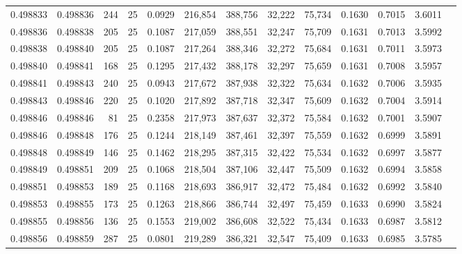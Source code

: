 \begin{tabular}{rrrrrrrrrrrrr}
0.498833 & 0.498836 & 244 &  25 &                                     0.0929 & 216,854 & 388,756 &  32,222 &  75,734 & 0.1630 & 0.7015 & 3.6011 \\
0.498836 & 0.498838 & 205 &  25 &                                     0.1087 & 217,059 & 388,551 &  32,247 &  75,709 & 0.1631 & 0.7013 & 3.5992 \\
0.498838 & 0.498840 & 205 &  25 &                                     0.1087 & 217,264 & 388,346 &  32,272 &  75,684 & 0.1631 & 0.7011 & 3.5973 \\
0.498840 & 0.498841 & 168 &  25 &                                     0.1295 & 217,432 & 388,178 &  32,297 &  75,659 & 0.1631 & 0.7008 & 3.5957 \\
0.498841 & 0.498843 & 240 &  25 &                                     0.0943 & 217,672 & 387,938 &  32,322 &  75,634 & 0.1632 & 0.7006 & 3.5935 \\
0.498843 & 0.498846 & 220 &  25 &                                     0.1020 & 217,892 & 387,718 &  32,347 &  75,609 & 0.1632 & 0.7004 & 3.5914 \\
0.498846 & 0.498846 &  81 &  25 &                                     0.2358 & 217,973 & 387,637 &  32,372 &  75,584 & 0.1632 & 0.7001 & 3.5907 \\
0.498846 & 0.498848 & 176 &  25 &                                     0.1244 & 218,149 & 387,461 &  32,397 &  75,559 & 0.1632 & 0.6999 & 3.5891 \\
0.498848 & 0.498849 & 146 &  25 &                                     0.1462 & 218,295 & 387,315 &  32,422 &  75,534 & 0.1632 & 0.6997 & 3.5877 \\
0.498849 & 0.498851 & 209 &  25 &                                     0.1068 & 218,504 & 387,106 &  32,447 &  75,509 & 0.1632 & 0.6994 & 3.5858 \\
0.498851 & 0.498853 & 189 &  25 &                                     0.1168 & 218,693 & 386,917 &  32,472 &  75,484 & 0.1632 & 0.6992 & 3.5840 \\
0.498853 & 0.498855 & 173 &  25 &                                     0.1263 & 218,866 & 386,744 &  32,497 &  75,459 & 0.1633 & 0.6990 & 3.5824 \\
0.498855 & 0.498856 & 136 &  25 &                                     0.1553 & 219,002 & 386,608 &  32,522 &  75,434 & 0.1633 & 0.6987 & 3.5812 \\
0.498856 & 0.498859 & 287 &  25 &                                     0.0801 & 219,289 & 386,321 &  32,547 &  75,409 & 0.1633 & 0.6985 & 3.5785 \\

\end{tabular}
